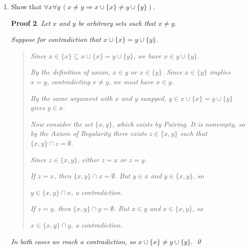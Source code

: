 \documentclass[12pt]{article}
\theoremstyle{proofstyle}
\newtheorem*{proof*}{Proof}
\begin{document}
\begin{enumerate}[left=0pt, itemsep=2em, parsep=1em]
\begin{enumerate}[label=(\alph*), itemsep=1.5em, leftmargin=2em]
\begin{proof*}
\begin{quote}
    Since $y \in \{x\}$, we have $y = x$.

    Thus $\{x\} \cap x = \emptyset$.

    Recall $x \in x \cup \{x\}$, since $x = x \cup \{x\}$ then $x \in x$.

    Since $x \in \{x\}$ and $x \in x$, we have $x \in \{x\} \cap x$.

    This contradicts $\{x\} \cap x = \emptyset$.
\end{quote}

    Therefore,by contradiction, $x \neq x \cup \{x\}$. \qed
\end{proof*}

\item Show that $\forall x \forall y\,(x \neq y \Rightarrow x \cup \{x\} \neq y \cup \{y\})$.

\begin{proof*}
    Let $x$ and $y$ be arbitrary sets such that $x \neq y$.

    Suppose for contradiction that $x \cup \{x\} = y \cup \{y\}$.

    \begin{quote}
        Since $x \in \{x\} \subseteq x \cup \{x\} = y \cup \{y\}$, we have $x \in y \cup \{y\}$.

        By the definition of union, $x \in y$ or $x \in \{y\}$. Since $x \in \{y\}$ implies $x = y$, contradicting $x \neq y$, we must have $x \in y$.

        By the same argument with $x$ and $y$ swapped, $y \in x \cup \{x\} = y \cup \{y\}$ gives $y \in x$.

        Now consider the set $\{x, y\}$, which exists by Pairing. It is nonempty, so by the Axiom of Regularity there exists $z \in \{x, y\}$ such that $\{x, y\} \cap z = \emptyset$.

        Since $z \in \{x, y\}$, either $z = x$ or $z = y$.

        If $z = x$, then $\{x, y\} \cap x = \emptyset$. But $y \in x$ and $y \in \{x, y\}$, so 
        
        $y \in \{x, y\} \cap x$, a contradiction.

        If $z = y$, then $\{x, y\} \cap y = \emptyset$. But $x \in y$ and $x \in \{x, y\}$, so 
        
        $x \in \{x, y\} \cap y$, a contradiction.
    \end{quote}

    In both cases we reach a contradiction, so $x \cup \{x\} \neq y \cup \{y\}$. \qed
\end{proof*}


\end{enumerate}
\end{enumerate}
\end{document}
